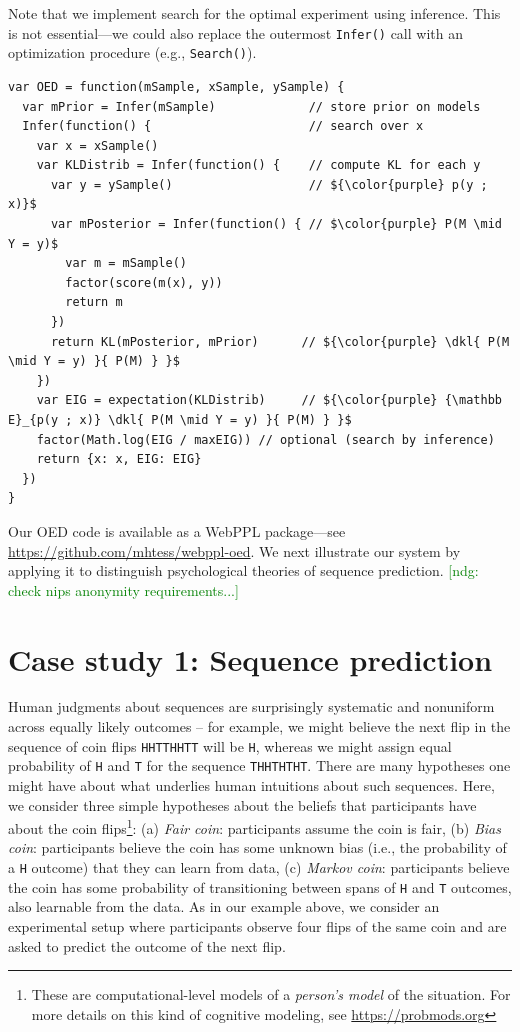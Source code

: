 \documentclass{article}
\newcommand{\dkl}{D_\mathrm{KL}\infdivx}
\newcommand{\ndg}[1]{\textcolor{Green}{[ndg: #1]}}
\begin{document}
Note that we implement search for the optimal experiment using inference.
This is not essential---we could also replace the outermost \lstinline|Infer()| call with an optimization procedure (e.g., \lstinline|Search()|).

\begin{lstlisting}[mathescape, label={code:oed-pp}, caption = {OED implementation. For clarity, we have omitted some book-keeping details.}]
var OED = function(mSample, xSample, ySample) {
  var mPrior = Infer(mSample)             // store prior on models
  Infer(function() {                      // search over x
    var x = xSample()
    var KLDistrib = Infer(function() {    // compute KL for each y
      var y = ySample()                   // ${\color{purple} p(y ; x)}$
      var mPosterior = Infer(function() { // $\color{purple} P(M \mid Y = y)$
        var m = mSample()
        factor(score(m(x), y))
        return m
      })
      return KL(mPosterior, mPrior)      // ${\color{purple} \dkl{ P(M \mid Y = y) }{ P(M) } }$
    })
    var EIG = expectation(KLDistrib)     // ${\color{purple} {\mathbb E}_{p(y ; x)} \dkl{ P(M \mid Y = y) }{ P(M) } }$
    factor(Math.log(EIG / maxEIG)) // optional (search by inference)
    return {x: x, EIG: EIG}
  })
}
\end{lstlisting}
Our OED code is available as a WebPPL package---see \url{https://github.com/mhtess/webppl-oed}.
We next illustrate our system by applying it to distinguish psychological theories of sequence prediction.
\ndg{check nips anonymity requirements...}

\section{Case study 1: Sequence prediction}
\label{s:tutorial}

Human judgments about sequences are surprisingly systematic and nonuniform across equally likely outcomes -- for example, we might believe the next flip in the  sequence of coin flips \lstinline{HHTTHHTT} will be \lstinline{H}, whereas we might assign equal probability of \lstinline{H} and \lstinline{T} for the sequence \lstinline{THHTHTHT}.
There are many hypotheses one might have about what underlies human intuitions about such sequences.
Here, we consider three simple hypotheses about the beliefs that participants have about the coin flips\footnote{These are computational-level models of a \emph{person's model} of the situation. For more details on this kind of cognitive modeling, see \url{https://probmods.org}}: (a) \emph{Fair coin}: participants assume the coin is fair, (b) \emph{Bias coin}: participants believe the coin has some unknown bias (i.e., the probability of a \lstinline{H} outcome) that they can learn from data, (c) \emph{Markov coin}: participants believe the coin has some probability of transitioning between spans of \lstinline{H} and \lstinline{T} outcomes, also learnable from the data.
As in our example above, we consider an experimental setup where participants observe four flips of the same coin and are asked to predict the outcome of the next flip.
\end{document}
